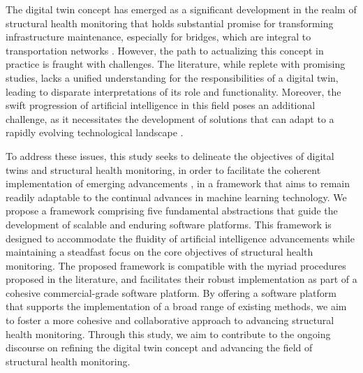 
The digital twin concept has emerged as a significant development in the realm of structural health monitoring that holds substantial promise for transforming infrastructure maintenance, especially for bridges, which are integral to  transportation networks \citep{alibrandi2022riskinformed,torzoni2024digital}. %
However, the path to actualizing this concept in practice is fraught with challenges. 
The literature, while replete with promising studies, lacks a unified understanding for the responsibilities of a digital twin, leading to disparate interpretations of its role and functionality. 
Moreover, the swift progression of artificial intelligence in this field poses an additional challenge, as it necessitates the development of solutions that can adapt to a rapidly evolving technological landscape \citep{mosalam2024artificial}.

To address these issues, this study seeks to delineate the objectives of digital twins and structural health monitoring, in order to facilitate the coherent implementation of emerging advancements \citep{kapteyn2021probabilistic,torzoni2024digital,chern2025evaces}, in a framework that aims to remain readily adaptable to the continual advances in machine learning technology. 
We propose a framework comprising five fundamental abstractions that guide the development of scalable and enduring software platforms. 
This framework is designed to accommodate the fluidity of artificial intelligence advancements while maintaining a steadfast focus on the core objectives of structural health monitoring.
The proposed framework is compatible with the myriad procedures proposed in
the literature, and facilitates their robust implementation
as part of a cohesive commercial-grade software platform.
By offering a software platform that supports the implementation of a broad range of existing methods, we aim to foster a more cohesive and collaborative approach to advancing structural health monitoring. 
Through this study, we aim to contribute to the ongoing discourse on refining the digital twin concept and advancing the field of structural health monitoring.




